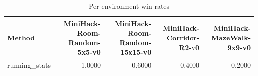 \begin{table}[htbp]
\centering
\caption{Per-environment win rates}
\label{tab:per-env}
\begin{tabular}{lrrrr}
\toprule
\textbf{Method} & \textbf{MiniHack-Room-Random-5x5-v0} & \textbf{MiniHack-Room-Random-15x15-v0} & \textbf{MiniHack-Corridor-R2-v0} & \textbf{MiniHack-MazeWalk-9x9-v0} \\
\midrule
running\_stats & 1.0000 & 0.6000 & 0.4000 & 0.2000 \\
\bottomrule
\end{tabular}
\end{table}